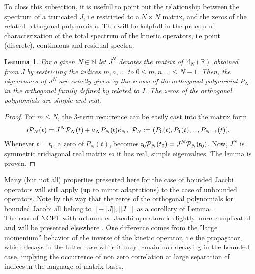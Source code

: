 \documentclass[10pt]{book}
\theoremstyle{break}
\newtheorem{lemma}{Lemma}
\begin{document}
To close this subsection, it is usefull to point out the relationship between the spectrum of a truncated $J$, i.e restricted to a $N\times N$ matrix, and the zeros of the related orthogonal polynomials. This will be helpfull in the process of characterization of the total spectrum of the kinetic operators, i.e point (discrete), continuous and residual spectra.
\begin{lemma}
For a given $N\in\mathbb{N}$ let $J^N$ denotes the matrix of $\mathbb{M}_N(\mathbb{R})$ obtained from $J$ %
by restricting the indices $m,n,...$ to $0\le m,n,...\le N-1$. Then, the eigenvalues of $J^N$ are exactly given by the zeroes of the orthogonal polynomial $P_N$ in the orthogonal family defined by %
related to $J$. The zeros of the orthogonal polynomials are simple and real.
\end{lemma}
\begin{proof}
For $m\le N$, the 3-term recurrence %
can be easily cast into the matrix form 
\begin{equation}
t{\cal{P}}_N(t)=J^N{\cal{P}}_N(t)+a_NP_N(t)e_N,\ {\cal{P}}_N:=(P_0(t),P_1(t),...,P_{N-1}(t)).
\end{equation}
Whenever $t=t_0$, a zero of $P_N(t)$, %
becomes $t_0{\cal{P}}_N(t_0)=J^N{\cal{P}}_N(t_0)$. Now, $J^N$ is symmetric tridiagonal real matrix so it has real, simple eigenvalues. The lemma is proven.
\end{proof}
Many (but not all) properties presented here for the case of bounded Jacobi operators will still apply (up to minor adaptations) to the case of unbounded operators. Note by the way that the zeros of the orthogonal polynomials for bounded Jacobi all belong to $[-||J||,||J||]$ as a corollary of Lemma %
.\\
The case of NCFT with unbounded Jacobi operators is slightly more complicated and will be presented elsewhere %
. One difference comes from the ''large momentum'' behavior of the inverse of the kinetic operator, i.e the propagator, which decays in the latter case while it may remain non decaying in the bounded case, implying the occurrence of non zero correlation at large separation of indices in the language of matrix bases.\\
\end{document}
